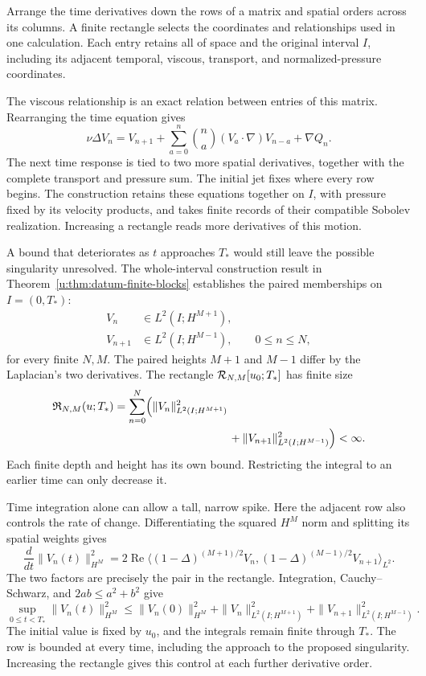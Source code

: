 Arrange the time derivatives down the rows of a matrix and spatial orders
across its columns. A finite rectangle selects the coordinates and
relationships used in one calculation. Each entry retains all of space and
the original interval \(I\), including its adjacent temporal, viscous,
transport, and normalized-pressure coordinates.

The viscous relationship is an exact relation between entries of this
matrix. Rearranging the time equation gives
\[
 \nu\Delta V_n=V_{n+1}
 +\sum_{a=0}^{n}\binom na(V_a\cdot\nabla)V_{n-a}
 +\nabla Q_n.
\]
The next time response is tied to two more spatial derivatives, together
with the complete transport and pressure sum. The initial jet fixes where
every row begins. The construction retains these equations together on
\(I\), with pressure fixed by its velocity products, and takes finite
records of their compatible Sobolev realization. Increasing a rectangle
reads more derivatives of this motion.

A bound that deteriorates as \(t\) approaches \(T_*\) would still
leave the possible singularity unresolved. The whole-interval construction
result in Theorem~\ref{u:thm:datum-finite-blocks} establishes the paired
memberships on \(I=(0,T_*)\):
\[
 \begin{aligned}
 V_n&\in L^2(I;H^{M+1}),\\
 V_{n+1}&\in L^2(I;H^{M-1}),
 \qquad 0\le n\le N,
 \end{aligned}
\]
for every finite \(N,M\). The paired heights \(M+1\) and \(M-1\)
differ by the Laplacian's two derivatives. The rectangle
\(\mathcal R_{N,M}[u_0;T_*]\) has finite size
\[
 \begin{aligned}
 \mathfrak R_{N,M}(u;T_*)
 &=\sum_{n=0}^{N}\Bigl(
   \|V_n\|_{L^2(I;H^{M+1})}^2\\
 &\hspace{36mm}+\|V_{n+1}\|_{L^2(I;H^{M-1})}^2\Bigr)<\infty.
 \end{aligned}
\]
Each finite depth and height has its own bound. Restricting the integral
to an earlier time can only decrease it.

Time integration alone can allow a tall, narrow spike. Here the adjacent
row also controls the rate of change. Differentiating the squared
\(H^M\) norm and splitting its spatial weights gives
\[
 \frac{d}{dt}\|V_n(t)\|_{H^M}^2
 =2\operatorname{Re}\langle
 (1-\Delta)^{(M+1)/2}V_n,
 (1-\Delta)^{(M-1)/2}V_{n+1}\rangle_{L^2}.
\]
The two factors are precisely the pair in the rectangle. Integration,
Cauchy--Schwarz, and \(2ab\le a^2+b^2\) give
\[
 \sup_{0\le t<T_*}\|V_n(t)\|_{H^M}^2
 \le\|V_n(0)\|_{H^M}^2
 +\|V_n\|_{L^2(I;H^{M+1})}^2
 +\|V_{n+1}\|_{L^2(I;H^{M-1})}^2.
\]
The initial value is fixed by \(u_0\), and the integrals remain finite
through \(T_*\). The row is bounded at every time, including the approach
to the proposed singularity. Increasing the rectangle gives this control
at each further derivative order.

